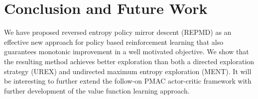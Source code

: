
\section{Conclusion and Future Work}
\label{sec:conclusion_and_future_work}

We have proposed reversed entropy policy mirror descent (REPMD)
as an effective new approach for policy based reinforcement learning
that also guarantees monotonic improvement in a well motivated objective.
We show that the resulting method achieves better exploration than both
a directed exploration strategy (UREX) and undirected maximum entropy
exploration (MENT). 
It will be interesting to further extend the follow-on
PMAC actor-critic framework
with further development of the value function learning approach.
